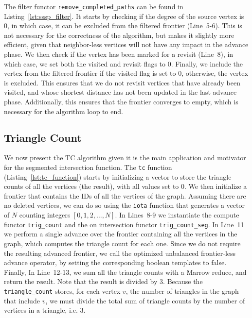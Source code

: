 The filter functor \texttt{remove\_completed\_paths} can be found in Listing~\ref{lst:sssp_filter}. It starts by checking if the degree of the source vertex is $0$, in which case, it can be excluded from the filtered frontier (Line~5-6). This is not necessary for the correctness of the algorithm, but makes it slightly more efficient, given that neighbor-less vertices will not have any impact in the advance phase. We then check if the vertex has been marked for a revisit (Line~8), in which case, we set both the visited and revisit flags to $0$. Finally, we include the vertex from the filtered frontier if the visited flag is set to $0$, otherwise, the vertex is excluded. This ensures that we do not revisit vertices that have already been visited, and whose shortest distance has not been updated in the last advance phase. Additionally, this ensures that the frontier converges to empty, which is necessary for the algorithm loop to end.




\subsection{Triangle Count} 

We now present the \gls{TC} algorithm given it is the main application and motivator for the segmented intersection function. The \texttt{tc} function (Listing~\ref{lst:tc_function}) starts by initializing a vector to store the triangle counts of all the vertices (the result), with all values set to $0$. We then initialize a frontier that contains the IDs of all the vertices of the graph. Assuming there are no deleted vertices, we can do so using the \texttt{iota} function that generates a vector of $N$ counting integers $[0, 1, 2, \ldots, N]$. 
In Lines~8-9 we instantiate the compute functor \texttt{trig\_count} and the on intersection functor \texttt{trig\_count\_seg}. In Line~11 we perform a single advance over the frontier containing all the vertices in the graph, which computes the triangle count for each one. Since we do not require the resulting advanced frontier, we call the optimized unbalanced frontier-less advance operator, by setting the corresponding boolean templates to false.
Finally, In Line~12-13, we sum all the triangle counts with a Marrow reduce, and return the result. Note that the result is divided by $3$. Because the \texttt{triangle\_count} stores, for each vertex $v$, the number of triangles in the graph that include $v$, we must divide the total sum of triangle counts by the number of vertices in a triangle, i.e. $3$.

